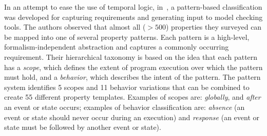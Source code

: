 \documentclass[letter]{llncs}
\begin{document}
\vspace{-3 pt}
In an attempt to ease the use of temporal logic,
in~\cite{Dwyer:1999:PPS:302405.302672}, a pattern-based classification
was developed for capturing requirements and generating input to model
checking tools. The authors observed that almost
all ($>500$)  properties they surveyed can be mapped into one of several
property patterns. Each pattern is a high-level, formalism-independent
abstraction and captures a commonly occurring requirement. Their
hierarchical taxonomy is based on the idea that each pattern has a
\emph{scope}, which defines the extent of program execution over which
the pattern must hold, and a \emph{behavior}, which describes the
intent of the pattern. The pattern system identifies 5 scopes and 11
behavior variations that can be combined to create 55 different property
templates. Examples of scopes are: \emph{globally}, and \emph{after}
an event or state occurs; examples of behavior classification are:
\emph{absence} (an event or state should never occur during an execution)
and \emph{response} (an event or state must be followed by another event
or state).
\end{document}
